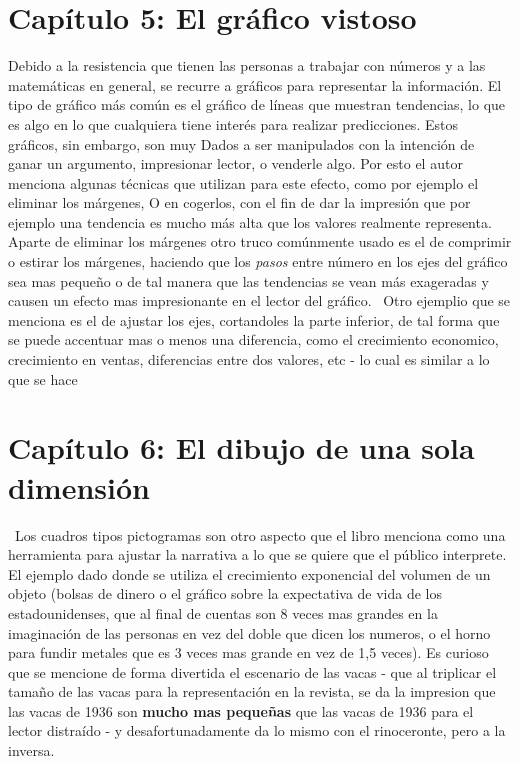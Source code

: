 \documentclass[a4paper, 11pt]{article}
\begin{document}
\section*{Capítulo 5: El gráfico vistoso}

Debido a la resistencia que tienen las personas a trabajar con números y a las matemáticas en general, se recurre a gráficos para representar la información. El tipo de gráfico más común es el gráfico de líneas que muestran tendencias, lo que es algo en lo que cualquiera tiene interés para realizar predicciones. Estos gráficos, sin embargo, son muy Dados a ser manipulados con la intención de ganar un argumento, impresionar lector, o venderle algo. Por esto el autor menciona algunas técnicas que utilizan para este efecto, como por ejemplo el eliminar los márgenes, O en cogerlos, con el fin de dar la impresión que por ejemplo una tendencia es mucho más alta que los valores realmente representa. Aparte de eliminar los márgenes otro truco comúnmente usado es el de comprimir o estirar los márgenes, haciendo que los \textit{pasos} entre número en los ejes del gráfico sea mas pequeño o  de tal manera que las tendencias se vean más exageradas y causen un efecto mas impresionante en el lector del gráfico.
 Otro ejemplio que se menciona es el de ajustar los ejes, cortandoles la parte inferior, de tal forma que se puede accentuar mas o menos una diferencia, como el crecimiento economico, crecimiento en ventas, diferencias entre dos valores, etc - lo cual es similar a lo que se hace 

\section*{Capítulo 6: El dibujo de una sola dimensión}

 Los cuadros tipos pictogramas son otro aspecto que el libro menciona como una herramienta para ajustar la narrativa a lo que se quiere que el público interprete. El ejemplo dado donde se utiliza el crecimiento exponencial del volumen de un objeto (bolsas de dinero o el gráfico sobre la expectativa de vida de los estadounidenses, que al final de cuentas son 8 veces mas grandes en la imaginación de las personas en vez del doble que dicen los numeros, o el horno para fundir metales que es 3 veces mas grande en vez de 1,5 veces). Es curioso que se mencione de forma divertida el escenario de las vacas - que al triplicar el tamaño de las vacas para la representación en la revista, se da la impresion que las vacas de 1936 son \textbf{mucho mas pequeñas} que las vacas de 1936 para el lector distraído - y desafortunadamente da lo mismo con el rinoceronte, pero a la inversa.
\end{document}
